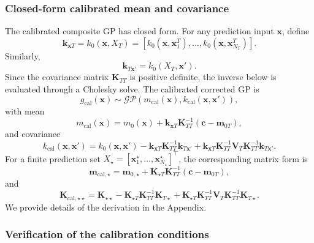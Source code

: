 \documentclass[journal]{new-aiaa}
\newcommand{\x}{\mathbf{x}}
\begin{document}
\subsubsection{Closed-form calibrated mean and covariance}
\label{subsec:closed_form_calibration}

The calibrated composite GP has closed form. For any prediction input $\x$, define
\[
\mathbf{k}_{\x T}
=
k_0(\x,X_T)
=
\left[k_0(\x,\x_1^T),\ldots,k_0(\x,\x_{N_T}^T)\right].
\]
Similarly,
\[
\mathbf{k}_{T\x'}=k_0(X_T,\x').
\]
Since the covariance matrix $\mathbf{K}_{TT}$ is positive definite, the inverse
below is evaluated through a Cholesky solve. The calibrated corrected GP is
\begin{equation*}
    g_{\mathrm{cal}}(\x)
    \sim
    \mathcal{GP}
    \left(
    m_{\mathrm{cal}}(\x),
    k_{\mathrm{cal}}(\x,\x')
    \right),
\end{equation*}
with mean
\begin{equation}
    m_{\mathrm{cal}}(\x)
    =
    m_0(\x)
    +
    \mathbf{k}_{\x T}
    \mathbf{K}_{TT}^{-1}
    \left(
    \mathbf{c}
    -
    \mathbf{m}_{0T}
    \right),
    \label{eq:calibrated_mean}
\end{equation}
and covariance
\[
    k_{\mathrm{cal}}(\x,\x')
    =
    k_0(\x,\x')
    -
    \mathbf{k}_{\x T}
    \mathbf{K}_{TT}^{-1}
    \mathbf{k}_{T\x'}
    +
    \mathbf{k}_{\x T}
    \mathbf{K}_{TT}^{-1}
    \mathbf{V}_T
    \mathbf{K}_{TT}^{-1}
    \mathbf{k}_{T\x'} .
\]
For a finite prediction set $X_\star=[\x_1^\star,\ldots,\x_{N_\star}^\star]^\top$,
the corresponding matrix form is
\begin{equation*}
    \mathbf{m}_{\mathrm{cal},\star}
    =
    \mathbf{m}_{0,\star}
    +
    \mathbf{K}_{\star T}
    \mathbf{K}_{TT}^{-1}
    \left(
    \mathbf{c}
    -
    \mathbf{m}_{0T}
    \right),
\end{equation*}
and
\[
    \mathbf{K}_{\mathrm{cal},\star\star}
    =
    \mathbf{K}_{\star\star}
    -
    \mathbf{K}_{\star T}
    \mathbf{K}_{TT}^{-1}
    \mathbf{K}_{T\star}
    +
    \mathbf{K}_{\star T}
    \mathbf{K}_{TT}^{-1}
    \mathbf{V}_T
    \mathbf{K}_{TT}^{-1}
    \mathbf{K}_{T\star}.
    \label{eq:calibrated_covariance_matrix}
\]
We provide details of the derivation in the Appendix.

\subsubsection{Verification of the calibration conditions}
\label{subsec:calibration_verification}
\end{document}
